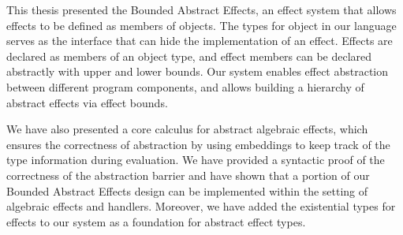 This thesis presented the Bounded Abstract Effects, an effect system that allows effects to be defined as members of objects. The types for object in our language serves as the interface that can hide the implementation of an effect. Effects are declared as members of an object type, and effect members can be declared abstractly with upper and lower bounds. Our system enables effect abstraction between different program components, and allows building a hierarchy of abstract effects via effect bounds.

We have also presented a core calculus for abstract algebraic effects, which ensures the correctness of abstraction by using embeddings to keep track of the type information during evaluation. We have provided a syntactic proof of the correctness of the abstraction barrier and have shown that a portion of our Bounded Abstract Effects design can be implemented within the setting of algebraic effects and handlers.  Moreover, we have added the existential types for effects to our system as a foundation for abstract effect types. 






